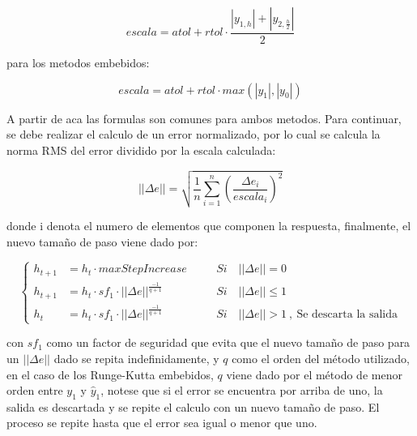                \begin{equation}\label{eq:escalaDos}
                    escala = atol + rtol \cdot \frac{\left|y_{1,h}\right| + \left|y_{2,\frac{h}{2}}\right|}{2}
                \end{equation}

                \noindent para los metodos embebidos:

                \begin{equation}\label{eq:escalaEmbebidos}
                    escala = atol + rtol \cdot max(\left| y_1\right|,\left| y_0\right|)
                \end{equation}
        
                A partir de aca las formulas son comunes para ambos metodos. Para continuar, se debe realizar el calculo de un error normalizado, por lo cual se calcula la norma RMS del error dividido por la escala calculada:

                \begin{equation}\label{eq:ErrorNormalizado}
                    ||\Delta e|| = \sqrt{\frac{1}{n} \sum_{i=1}^{n} \left(\frac{\Delta e_i}{escala_i}\right)^2}
                \end{equation}

                \noindent donde i denota el numero de elementos que componen la respuesta, finalmente, el nuevo tamaño de paso viene dado por:
                
                \begin{equation}
                    \left\{
                    \begin{aligned}
                        h_{t+1} &= h_{t}\cdot maxStepIncrease &\quad &Si \quad ||\Delta e|| = 0\\
                        h_{t+1} &= h_{t}\cdot sf_1 \cdot ||\Delta e||^{\frac{-1}{q+1}}  &\quad &Si \quad ||\Delta e|| \leq 1 \\
                        h_{t} &= h_{t}\cdot sf_1 \cdot ||\Delta e||^{\frac{-1}{q+1}}  &\quad &Si \quad ||\Delta e|| > 1 \ ,\ \text{Se descarta la salida}
                    \end{aligned}\right.
                \end{equation}
                
                \noindent con $sf_1$ como un factor de seguridad que evita que el nuevo tamaño de paso para un $||\Delta e||$ dado se repita indefinidamente, y $q$ como el orden del método utilizado, en el caso de los Runge-Kutta embebidos, $q$ viene dado por el método de menor orden entre $y_1$ y $\hat{y}_1$, notese que si el error se encuentra por arriba de uno, la salida es descartada y se repite el calculo con un nuevo tamaño de paso. El proceso se repite hasta que el error sea igual o menor que uno.
    
